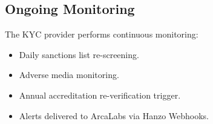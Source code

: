 \subsection{Ongoing Monitoring}

The KYC provider performs continuous monitoring:
\begin{itemize}[leftmargin=1.4em]
    \item Daily sanctions list re-screening.
    \item Adverse media monitoring.
    \item Annual accreditation re-verification trigger.
    \item Alerts delivered to ArcaLabs via Hanzo Webhooks.
\end{itemize}

